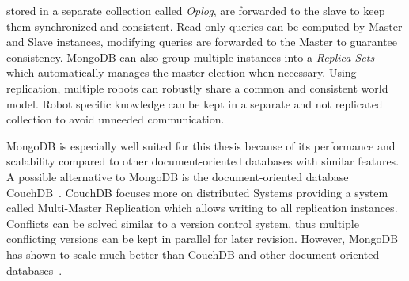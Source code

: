 \documentclass[a4paper,11pt]{article}
\begin{document}
stored in a separate collection called \emph{Oplog}, are forwarded to
the slave to keep them synchronized and consistent.
Read only queries can be
computed by Master and Slave instances, modifying queries are
forwarded to the Master to guarantee consistency.
MongoDB can also group multiple
instances into a \emph{Replica Sets} which automatically manages
the master election when necessary. Using replication,
multiple robots can robustly share a common and consistent world
model. Robot specific knowledge can be kept in a separate and not
replicated collection to avoid unneeded communication.

MongoDB is especially well suited for this thesis because of its
performance and scalability compared to other document-oriented
databases with similar features. A possible alternative to MongoDB is
the document-oriented database CouchDB~\cite{CouchDB}. CouchDB
focuses more on distributed Systems providing a system called
Multi-Master Replication which allows writing to all replication instances.
Conflicts can be solved similar to a version
control system, thus multiple conflicting versions can be kept in
parallel for later revision. However, MongoDB has shown to scale much
better than CouchDB and other document-oriented databases~\cite{db-comparison}.

\end{document}
